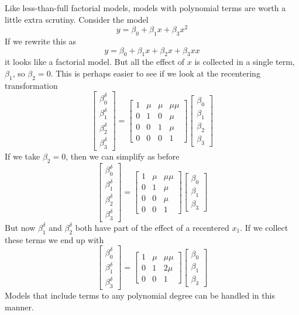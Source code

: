 \documentclass[]{article}
\begin{document}
Like less-than-full factorial models, models with polynomial terms are
worth a little extra scrutiny. Consider the model
\[y = \beta_0 + \beta_1x + \beta_3x^2\] If we rewrite this as
\[y = \beta_0 + \beta_1x + \beta_2x +\beta_3xx\] it looks like a
factorial model. But all the effect of \(x\) is collected in a single
term, \(\beta_1\), so \(\beta_2=0\). This is perhaps easier to see if we
look at the recentering transformation
\[\begin{bmatrix}\beta_0^\delta \\ \beta_1^\delta \\ \beta_2^\delta \\ \beta_3^\delta \end{bmatrix}=
\begin{bmatrix} 1 & \mu &\mu &\mu\mu \\
  0 &1 &0 &\mu \\ 0 &0 &1 &\mu \\ 0 &0 &0 &1 \end{bmatrix}
\begin{bmatrix}\beta_0 \\ \beta_1 \\ \beta_2 \\ \beta_3  \end{bmatrix}\]
If we take \(\beta_2=0\), then we can simplify as before
\[\begin{bmatrix}\beta_0^\delta \\ \beta_1^\delta \\ \beta_2^\delta \\ \beta_3^\delta \end{bmatrix}=
\begin{bmatrix} 1 & \mu &\mu\mu \\
  0 &1 &\mu \\ 0 &0 &\mu \\ 0 &0 &1 \end{bmatrix}
\begin{bmatrix}\beta_0 \\ \beta_1 \\ \beta_3  \end{bmatrix}\] But now
\(\beta_1^\delta\) and \(\beta_2^\delta\) both have part of the effect
of a recentered \(x_1\). If we collect these terms we end up with
\[\begin{bmatrix}\beta_0^\delta \\ \beta_1^\delta \\ \beta_3^\delta \end{bmatrix}=
\begin{bmatrix} 1 & \mu &\mu\mu \\
  0 &1 &2\mu \\ 0 &0 &1 \end{bmatrix}
\begin{bmatrix}\beta_0 \\ \beta_1 \\ \beta_3  \end{bmatrix}\] Models
that include terms to any polynomial degree can be handled in this
manner.
\end{document}
